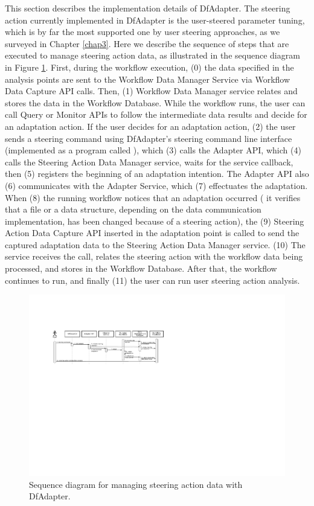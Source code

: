 This section describes the implementation details of DfAdapter. The steering action currently implemented in DfAdapter is the user-steered parameter tuning, which is by far the most supported one by user steering approaches, as we surveyed in Chapter \ref{chap3}.
Here we describe the sequence of steps that are executed to manage steering action data, as illustrated in the sequence diagram in Figure \ref{fig:dfadapter_seq_diagram}.
First, during the workflow execution, (0) the data
specified in the analysis points are sent to the Workflow Data Manager Service via
Workflow Data Capture API calls.
Then, (1) Workflow Data Manager service relates and stores
the data in the Workflow Database.
While the workflow
runs, the user can call Query or Monitor APIs to follow the
intermediate data results and decide for an adaptation action.
If the user
decides for an adaptation action,
(2) the user sends a steering command
using DfAdapter's steering command line interface (implemented as a program called ), which (3) calls the
Adapter API,
which (4) calls the Steering Action Data Manager service, 
waits for the service callback, then (5) registers the beginning of an adaptation intention.
The Adapter API also (6)
communicates with the Adapter Service, which (7)  effectuates the adaptation.
When (8) the running
workflow notices that an adaptation occurred (\eg{} it verifies
that a file or a data structure, depending on the data communication
implementation, has been changed because of a steering action), the (9)
Steering Action Data Capture API inserted in the adaptation point is
called to send the captured adaptation data to the Steering Action Data Manager service.
(10) The service receives the call, relates the steering action with the workflow data being processed, and stores in the Workflow Database. 
After that, the workflow
continues to run, and finally
(11) the user can run user steering action analysis.

\begin{figure}[H]
    \centering
    \includegraphics[width=\textwidth,keepaspectratio]{img/df_adapter_seq_diagram.pdf}
    \caption{Sequence diagram for managing steering action data with DfAdapter.}
    \label{fig:dfadapter_seq_diagram}
\end{figure}

